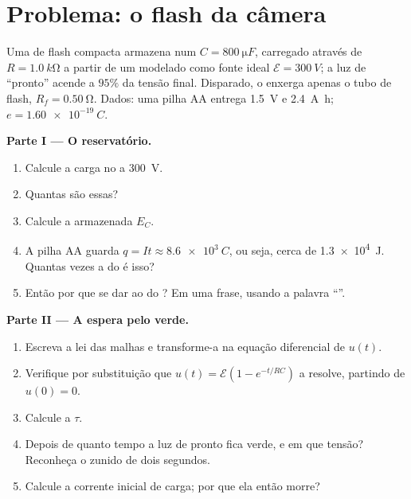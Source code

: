 \section{Problema: o flash da câmera}

\begin{problem}
\label{pb:g12:rc-rl-circuits:1}
Uma  de flash compacta armazena  num  $C = \qty{800}{\micro F}$,
carregado através de $R = \qty{1.0}{k\ohm}$ a partir de um  modelado como fonte
ideal $\mathcal{E} = \qty{300}{V}$; a luz de ``pronto'' acende a $95\%$ da tensão
final. Disparado, o  enxerga apenas o tubo de flash,
$R_f = \qty{0.50}{\ohm}$. Dados: uma pilha AA entrega \qty{1.5}{V} e \qty{2.4}{A.h};
$e = \qty{1.60e-19}{C}$.

\medskip
\noindent\textbf{Parte I --- O reservatório.}
\begin{enumerate}
  \item Calcule a carga no  a \qty{300}{V}.
  \item Quantas  são essas?
  \item Calcule a  armazenada $E_C$.
  \item A pilha AA guarda $q = It \approx \qty{8.6e3}{C}$, ou seja, cerca de
        \qty{1.3e4}{J}. Quantas vezes a  do  é isso?
  \item Então por que se dar ao  do ? Em uma frase, usando a palavra
        ``''.
\end{enumerate}

\medskip
\noindent\textbf{Parte II --- A espera pelo verde.}
\begin{enumerate}[resume]
  \item Escreva a lei das malhas e transforme-a na equação diferencial de $u(t)$.
  \item Verifique por substituição que $u(t) = \mathcal{E}(1 - e^{-t/RC})$ a resolve,
        partindo de $u(0) = 0$.
  \item Calcule a  $\tau$.
  \item Depois de quanto tempo a luz de pronto fica verde, e em que tensão? Reconheça o
        zunido de dois segundos.
  \item Calcule a corrente inicial de carga; por que ela então morre?
\end{enumerate}


\end{problem}
